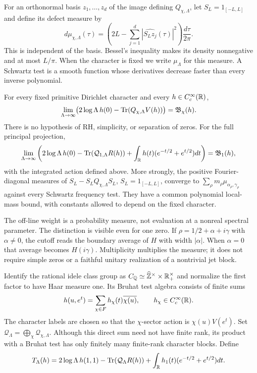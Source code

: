 For an orthonormal basis $z_1,\ldots,z_d$ of the image defining
$Q_{\chi,\Lambda}$, let $S_L=1_{[-L,L]}$ and define its defect measure by
\begin{equation}\label{eq:intro-defect-measure}
 d\mu_{\chi,\Lambda}(\tau)=
 \left(2L-\sum_{j=1}^d|\widehat{S_Lz_j}(\tau)|^2\right)
                                                    \frac{d\tau}{2\pi}.
\end{equation}
This is independent of the basis. Bessel's inequality makes its density
nonnegative and at most $L/\pi$. When the character is fixed we write
$\mu_\Lambda$ for this measure. A Schwartz test is a smooth function
whose derivatives decrease faster than every inverse polynomial.

\begin{theorem}
\label{thm:main-dirichlet}
For every fixed primitive Dirichlet character and every
$h\in C_c^\infty(\mathbb R)$,
\begin{equation}\label{eq:main-sector-limit}
 \lim_{\Lambda\to\infty}
 \bigl(2\log\Lambda\,h(0)-\operatorname{Tr}(Q_{\chi,\Lambda}V(h))\bigr)
                  =\mathfrak B_\chi(h).
\end{equation}
There is no hypothesis of RH, simplicity, or separation of zeros.
For the full principal projection,
\begin{equation}\label{eq:main-principal-limit}
 \lim_{\Lambda\to\infty}
 \left(2\log\Lambda\,h(0)
       -\operatorname{Tr}(\mathcal Q_{1,\Lambda}R(h))
       +\int_\mathbb R h(t)(e^{-t/2}+e^{t/2})dt\right)
                         =\mathfrak B_1(h),
\end{equation}
with the integrated action defined above.
More strongly, the positive Fourier-diagonal measures of
$S_L-S_LQ_{\chi,\Lambda}S_L$, $S_L=1_{[-L,L]}$, converge to
$\sum_\rho m_\rho\mu_{\alpha_\rho,\gamma_\rho}$ against every
Schwartz frequency test. They have a common polynomial local-mass
bound, with constants allowed to depend on the fixed character.
\end{theorem}

The off-line weight is a probability measure, not evaluation at a
nonreal spectral parameter. The distinction is visible even for
one zero. If $\rho=1/2+\alpha+i\gamma$ with $\alpha\ne0$, the
cutoff reads the boundary average of $H$ with width $|\alpha|$.
When $\alpha=0$ that average becomes $H(i\gamma)$.
Multiplicity multiplies the measure; it does not require simple
zeros or a faithful unitary realization of a nontrivial jet block.

Identify the rational idele class group as
$C_\mathbb Q\simeq\widehat{\mathbb Z}^{\times}\times\mathbb R_+^{\times}$ and normalize
the first factor to have Haar measure one. Its Bruhat test algebra
consists of finite sums
\[
 h(u,e^t)=\sum_{\chi\in F}h_\chi(t)\overline{\chi(u)},
                  \qquad h_\chi\in C_c^\infty(\mathbb R).
\]
The character labels are chosen so that the $\chi$-sector action
is $\chi(u)V(e^t)$. Set
$\mathcal Q_\Lambda=\bigoplus_\chi\mathcal Q_{\chi,\Lambda}$.
Although this direct sum need not have finite rank, its product
with a Bruhat test has only finitely many finite-rank character
blocks. Define
\[
 T_\Lambda(h)=2\log\Lambda\,h(1,1)
       -\operatorname{Tr}(\mathcal Q_\Lambda R(h))
       +\int_\mathbb R h_1(t)(e^{-t/2}+e^{t/2})dt.
\]

